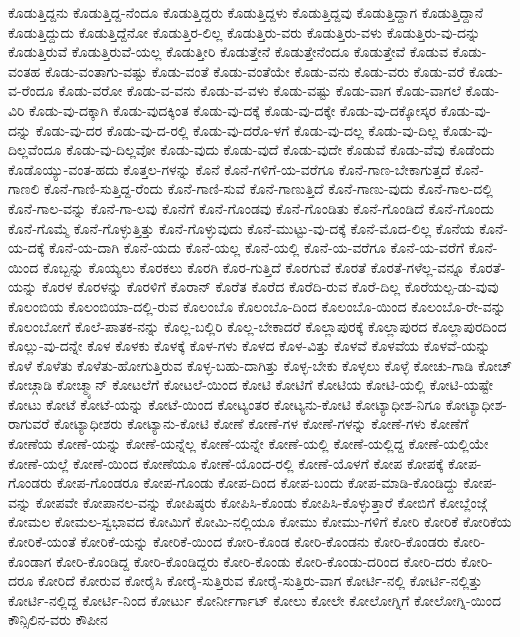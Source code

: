 {ಕೊಡುತ್ತಿದ್ದನು
ಕೊಡುತ್ತಿದ್ದ-ನೆಂದೂ
ಕೊಡುತ್ತಿದ್ದರು
ಕೊಡುತ್ತಿದ್ದಳು
ಕೊಡುತ್ತಿದ್ದವು
ಕೊಡುತ್ತಿದ್ದಾಗ
ಕೊಡುತ್ತಿದ್ದಾನೆ
ಕೊಡುತ್ತಿದ್ದುದು
ಕೊಡುತ್ತಿದ್ದೆನೋ
ಕೊಡುತ್ತಿರ-ಲಿಲ್ಲ
ಕೊಡುತ್ತಿರು-ವರು
ಕೊಡುತ್ತಿರು-ವಳು
ಕೊಡುತ್ತಿರು-ವು-ದನ್ನು
ಕೊಡುತ್ತಿರುವೆ
ಕೊಡುತ್ತಿರುವೆ-ಯಲ್ಲ
ಕೊಡುತ್ತೀರಿ
ಕೊಡುತ್ತೇನೆ
ಕೊಡುತ್ತೇನೆಂದೂ
ಕೊಡುತ್ತೇವೆ
ಕೊಡುವ
ಕೊಡು-ವಂತಹ
ಕೊಡು-ವಂತಾಗು-ವಷ್ಟು
ಕೊಡು-ವಂತೆ
ಕೊಡು-ವಂತೆಯೇ
ಕೊಡು-ವನು
ಕೊಡು-ವರು
ಕೊಡು-ವರೆ
ಕೊಡು-ವ-ರೆಂದೂ
ಕೊಡು-ವರೋ
ಕೊಡು-ವ-ವನು
ಕೊಡು-ವ-ವಳು
ಕೊಡು-ವಷ್ಟು
ಕೊಡು-ವಾಗ
ಕೊಡು-ವಾಗಲೆ
ಕೊಡು-ವಿರಿ
ಕೊಡು-ವು-ದಕ್ಕಾಗಿ
ಕೊಡು-ವುದಕ್ಕಿಂತ
ಕೊಡು-ವು-ದಕ್ಕೆ
ಕೊಡು-ವು-ದಕ್ಕೇ
ಕೊಡು-ವು-ದಕ್ಕೋಸ್ಕರ
ಕೊಡು-ವು-ದನ್ನು
ಕೊಡು-ವು-ದರ
ಕೊಡು-ವು-ದ-ರಲ್ಲಿ
ಕೊಡು-ವು-ದರೊ-ಳಗೆ
ಕೊಡು-ವು-ದಲ್ಲ
ಕೊಡು-ವು-ದಿಲ್ಲ
ಕೊಡು-ವು-ದಿಲ್ಲವೆಂದೂ
ಕೊಡು-ವು-ದಿಲ್ಲವೋ
ಕೊಡು-ವುದು
ಕೊಡು-ವುದೆ
ಕೊಡು-ವುದೇ
ಕೊಡುವೆ
ಕೊಡು-ವೆವು
ಕೊಡೆಂದು
ಕೊಡೊಯ್ಯು-ವಂತ-ಹದು
ಕೊತ್ತಲ-ಗಳನ್ನು
ಕೊನೆ
ಕೊನೆ-ಗಳಿಗೆ-ಯ-ವರೆಗೂ
ಕೊನೆ-ಗಾಣ-ಬೇಕಾಗುತ್ತದೆ
ಕೊನೆ-ಗಾಣಲಿ
ಕೊನೆ-ಗಾಣಿ-ಸುತ್ತಿದ್ದ-ರೆಂದು
ಕೊನೆ-ಗಾಣಿ-ಸುವೆ
ಕೊನೆ-ಗಾಣುತ್ತಿದೆ
ಕೊನೆ-ಗಾಣು-ವುದು
ಕೊನೆ-ಗಾಲ-ದಲ್ಲಿ
ಕೊನೆ-ಗಾಲ-ವನ್ನು
ಕೊನೆ-ಗಾ-ಲವು
ಕೊನೆಗೆ
ಕೊನೆ-ಗೊಂಡವು
ಕೊನೆ-ಗೊಂಡಿತು
ಕೊನೆ-ಗೊಂಡಿದೆ
ಕೊನೆ-ಗೊಂದು
ಕೊನೆ-ಗೊಮ್ಮೆ
ಕೊನೆ-ಗೊಳ್ಳುತ್ತಿತ್ತು
ಕೊನೆ-ಗೊಳ್ಳುವುದು
ಕೊನೆ-ಮುಟ್ಟು-ವು-ದಕ್ಕೆ
ಕೊನೆ-ಮೊದ-ಲಿಲ್ಲ
ಕೊನೆಯ
ಕೊನೆ-ಯ-ದಕ್ಕೆ
ಕೊನೆ-ಯ-ದಾಗಿ
ಕೊನೆ-ಯದು
ಕೊನೆ-ಯಲ್ಲ
ಕೊನೆ-ಯಲ್ಲಿ
ಕೊನೆ-ಯ-ವರೆಗೂ
ಕೊನೆ-ಯ-ವರೆಗೆ
ಕೊನೆ-ಯಿಂದ
ಕೊಬ್ಬನ್ನು
ಕೊಯ್ಯಲು
ಕೊರಕಲು
ಕೊರಗಿ
ಕೊರ-ಗುತ್ತಿದೆ
ಕೊರಗುವೆ
ಕೊರತೆ
ಕೊರತೆ-ಗಳೆಲ್ಲ-ವನ್ನೂ
ಕೊರತೆ-ಯನ್ನು
ಕೊರಳ
ಕೊರಳನ್ನು
ಕೊರಳಿಗೆ
ಕೊರಾನ್
ಕೊರೆತ
ಕೊರೆದ
ಕೊರೆದಿ-ರುವ
ಕೊರೆ-ದಿಲ್ಲ
ಕೊರೆಯಲ್ಪ-ಡು-ವುವು
ಕೊಲಂಬಿಯ
ಕೊಲಂಬಿಯಾ-ದಲ್ಲಿ-ರುವ
ಕೊಲಂಬೊ
ಕೊಲಂಬೊ-ದಿಂದ
ಕೊಲಂಬೊ-ಯಿಂದ
ಕೊಲಂಬೊ-ರೇ-ವನ್ನು
ಕೊಲಂಬೋಗೆ
ಕೊಲೆ-ಪಾತಕ-ನನ್ನು
ಕೊಲ್ಲ-ಬಲ್ಲಿರಿ
ಕೊಲ್ಲ-ಬೇಕಾದರೆ
ಕೊಲ್ಲಾಪುರಕ್ಕೆ
ಕೊಲ್ಲಾಪುರದ
ಕೊಲ್ಲಾಪುರದಿಂದ
ಕೊಲ್ಲು-ವು-ದನ್ನೇ
ಕೊಳ
ಕೊಳಕು
ಕೊಳಕ್ಕೆ
ಕೊಳ-ಗಳು
ಕೊಳದ
ಕೊಳ-ವಿತ್ತು
ಕೊಳವೆ
ಕೊಳವೆಯ
ಕೊಳವೆ-ಯನ್ನು
ಕೊಳೆ
ಕೊಳೆತು
ಕೊಳೆತು-ಹೋಗುತ್ತಿರುವ
ಕೊಳ್ಳ-ಬಹು-ದಾಗಿತ್ತು
ಕೊಳ್ಳ-ಬೇಕು
ಕೊಳ್ಳಲು
ಕೊಳ್ಳೆ
ಕೋಚು-ಗಾಡಿ
ಕೋಚ್
ಕೋಚ್ಗಾಡಿ
ಕೋಚ್ಮ್ಯಾನ್
ಕೋಟಲೆಗೆ
ಕೋಟಲೆ-ಯಿಂದ
ಕೋಟಿ
ಕೋಟಿಗೆ
ಕೋಟಿಯ
ಕೋಟಿ-ಯಲ್ಲಿ
ಕೋಟಿ-ಯಷ್ಟೇ
ಕೋಟು
ಕೋಟೆ
ಕೋಟೆ-ಯನ್ನು
ಕೋಟೆ-ಯಿಂದ
ಕೋಟ್ಯಂತರ
ಕೋಟ್ಯನು-ಕೋಟಿ
ಕೋಟ್ಯಾಧೀಶ-ನಿಗೂ
ಕೋಟ್ಯಾಧೀಶ-ರಾಗುವರೆ
ಕೋಟ್ಯಾಧೀಶರು
ಕೋಟ್ಯಾನು-ಕೋಟಿ
ಕೋಣೆ
ಕೋಣೆ-ಗಳ
ಕೋಣೆ-ಗಳನ್ನು
ಕೋಣೆ-ಗಳು
ಕೋಣೆಗೆ
ಕೋಣೆಯ
ಕೋಣೆ-ಯನ್ನು
ಕೋಣೆ-ಯನ್ನೆಲ್ಲ
ಕೋಣೆ-ಯನ್ನೇ
ಕೋಣೆ-ಯಲ್ಲಿ
ಕೋಣೆ-ಯಲ್ಲಿದ್ದ
ಕೋಣೆ-ಯಲ್ಲಿಯೇ
ಕೋಣೆ-ಯಲ್ಲೆ
ಕೋಣೆ-ಯಿಂದ
ಕೋಣೆಯೂ
ಕೋಣೆ-ಯೊಂದ-ರಲ್ಲಿ
ಕೋಣೆ-ಯೊಳಗೆ
ಕೋಪ
ಕೋಪಕ್ಕೆ
ಕೋಪ-ಗೊಂಡರು
ಕೋಪ-ಗೊಂಡರೂ
ಕೋಪ-ಗೊಂಡು
ಕೋಪ-ದಿಂದ
ಕೋಪ-ಬಂದು
ಕೋಪ-ಮಾಡಿ-ಕೊಂಡಿದ್ದು
ಕೋಪ-ವನ್ನು
ಕೋಪವೇ
ಕೋಪಾನಲ-ವನ್ನು
ಕೋಪಿಷ್ಠರು
ಕೋಪಿಸಿ-ಕೊಂಡು
ಕೋಪಿಸಿ-ಕೊಳ್ಳುತ್ತಾರೆ
ಕೋಬಿಗೆ
ಕೋಬ್ಲೆಂಜ್ಗೆ
ಕೋಮಲ
ಕೋಮಲ-ಸ್ವಭಾವದ
ಕೋಮಿಗೆ
ಕೋಮಿ-ನಲ್ಲಿಯೂ
ಕೋಮು
ಕೋಮು-ಗಳಿಗೆ
ಕೋರಿ
ಕೋರಿಕೆ
ಕೋರಿಕೆಯ
ಕೋರಿಕೆ-ಯಂತೆ
ಕೋರಿಕೆ-ಯನ್ನು
ಕೋರಿಕೆ-ಯಿಂದ
ಕೋರಿ-ಕೊಂಡ
ಕೋರಿ-ಕೊಂಡನು
ಕೋರಿ-ಕೊಂಡರು
ಕೋರಿ-ಕೊಂಡಾಗ
ಕೋರಿ-ಕೊಂಡಿದ್ದ
ಕೋರಿ-ಕೊಂಡಿದ್ದರು
ಕೋರಿ-ಕೊಂಡು
ಕೋರಿ-ಕೊಂಡು-ದರಿಂದ
ಕೋರಿ-ದರು
ಕೋರಿ-ದರೂ
ಕೋರಿದೆ
ಕೋರುವ
ಕೋರೈಸಿ
ಕೋರೈ-ಸುತ್ತಿರುವ
ಕೋರೈ-ಸುತ್ತಿರು-ವಾಗ
ಕೋರ್ಟಿ-ನಲ್ಲಿ
ಕೋರ್ಟಿ-ನಲ್ಲಿತ್ತು
ಕೋರ್ಟಿ-ನಲ್ಲಿದ್ದ
ಕೋರ್ಟಿ-ನಿಂದ
ಕೋರ್ಟು
ಕೋರ್ನೀರ್ಗಾಟ್
ಕೋಲು
ಕೋಲೇ
ಕೋಲೋಗ್ನಿಗೆ
ಕೋಲೋಗ್ನಿ-ಯಿಂದ
ಕೌನ್ಸಿಲಿನ-ವರು
ಕೌಪೀನ
}
